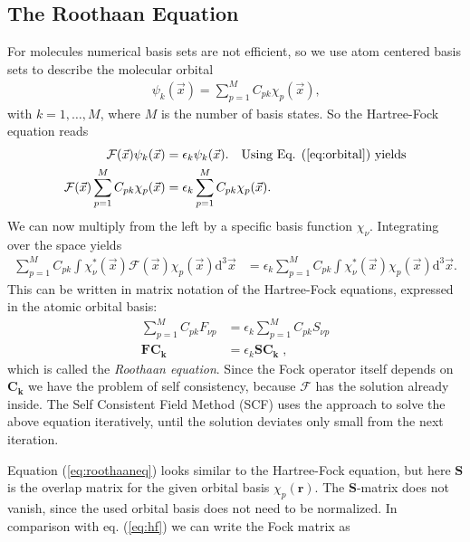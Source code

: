 \documentclass[twoside,        %
			   12pt,			%
               BCOR10mm,       %
               ngerman,english  %
               ]{scrartcl}
\begin{document}
\subsection{The Roothaan Equation}\label{subseq:roothaan}
For molecules numerical basis sets are not efficient, so we use atom centered basis sets to describe the molecular orbital
\begin{align}\label{eq:orbital}
    \psi_k(\vec{x}) = \sum_{p=1}^M C_{pk} \chi_p (\vec{x})\text{,}
\end{align}
with $k = 1,\dots, M$, where $M$ is the number of basis states.
So the Hartree-Fock equation reads
\begin{align*}
    \mathcal{F} (\vec{x})   \psi_k(\vec{x}) &= \epsilon_k    \psi_k(\vec{x})\text{.} \quad \text{Using Eq. (\ref{eq:orbital}) yields}\\
    \mathcal{F} (\vec{x})  \sum_{p=1}^M C_{pk} \chi_p (\vec{x}) &= \epsilon_k \sum_{p=1}^M C_{pk} \chi_p (\vec{x})\text{.}\\
\end{align*}
We can now multiply from the left by a specific basis function $\chi_\nu$. Integrating over the space yields
\begin{align*}
     \sum_{p=1}^M C_{pk} \int \chi_\nu^*(\vec{x})  \mathcal{F} (\vec{x}) \chi_p(\vec{x})\text{d}^3 \vec{x} & =  \epsilon_k  \sum_{p=1}^M C_{pk} \int \chi_\nu^*(\vec{x}) \chi_p(\vec{x})\text{d}^3 \vec{x}   \text{.}
\end{align*}
This can be written in matrix notation of the Hartree-Fock equations, expressed in the atomic orbital basis:
\begin{align}\label{eq:roothaaneq}
    \sum_{p=1}^M C_{pk} F_{\nu p}  &= \epsilon_k \sum_{p=1}^M C_{pk} S_{\nu p}\nonumber\\
    \mathbf{F} \mathbf{C_k} &= \epsilon_k \mathbf{S} \mathbf{C_k} \; \text{,}
\end{align} which is called the \textit{Roothaan equation}.
Since the Fock operator itself depends on $\mathbf{C_k}$ we have the problem of self consistency, because $\mathcal{F}$ has the solution already inside. The Self Consistent Field Method (SCF) uses the approach to solve the above equation iteratively, until the solution deviates only small from the next iteration.
\par Equation (\ref{eq:roothaaneq}) looks similar to the Hartree-Fock equation, but here $\mathbf{S}$ is the overlap matrix for the given orbital basis $\chi_p (\mathbf{r})$. The $\mathbf{S}$-matrix does not vanish, since the used orbital basis does not need to be normalized. In comparison with eq. (\ref{eq:hf}) we can write the Fock matrix as \cite{Thijssen2007}
\end{document}
